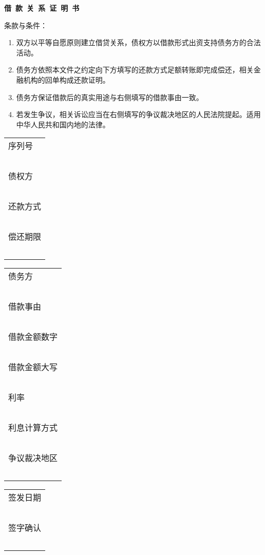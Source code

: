 \documentclass[a4paper,10pt]{article}
\newcommand{\infobox}[1]{
    {\small #1} \\
    {\Huge\vphantom{1AThjp}~~~\vspace{5pt}} \\
    \hline
}
\begin{document}
\begin{center}
    \LARGE\bfseries
    借~款~关~系~证~明~书
\end{center}

\vfill

\begin{multicols}{2}
    条款与条件：

    \begin{enumerate}[itemsep=4pt,parsep=4pt]
		\item 双方以平等自愿原则建立借贷关系，债权方以借款形式出资支持债务方的合法活动。
		\item 债务方依照本文件之约定向下方填写的还款方式足额转账即完成偿还，相关金融机构的回单构成还款证明。
		\item 债务方保证借款后的真实用途与右侧填写的借款事由一致。
		\item 若发生争议，相关诉讼应当在右侧填写的争议裁决地区的人民法院提起。适用中华人民共和国内地的法律。
	\end{enumerate}
	\vfill
    
	\begin{tabu}{|X|}
        \hline
		\infobox{序列号}
		\infobox{债权方}
		\infobox{还款方式}
		\infobox{偿还期限}
	\end{tabu}

    \columnbreak

	\begin{tabu}{|X|}
        \hline
		\infobox{债务方}
		\infobox{借款事由}
		\infobox{借款金额数字}
		\infobox{借款金额大写}
		\infobox{利率}
		\infobox{利息计算方式}
		\infobox{争议裁决地区}
	\end{tabu}

    \vfill

	\begin{tabu}{|X|}
        \hline
		\infobox{签发日期}
		\infobox{签字确认}
	\end{tabu}
\end{multicols}
\end{document}
